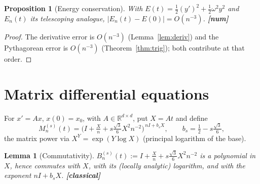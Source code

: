 \documentclass[11pt]{article}
\theoremstyle{plain}
\newtheorem{proposition}[theorem]{Proposition}
\newtheorem{lemma}[theorem]{Lemma}
\theoremstyle{definition}
\theoremstyle{remark}
\newcommand{\R}{\mathbb{R}}
\begin{document}
\begin{proposition}[Energy conservation]\label{prop:energy}
With $E(t)=\tfrac12(y')^2+\tfrac12\omega^2y^2$ and $E_n(t)$ its telescoping
analogue, $|E_n(t)-E(0)| = O(n^{-3})$. \hfill\textbf{[num]}
\end{proposition}
\begin{proof}
The derivative error is $O(n^{-3})$ (Lemma~\ref{lem:deriv}) and the Pythagorean
error is $O(n^{-3})$ (Theorem~\ref{thm:trig}); both contribute at that order.
\end{proof}

\section{Matrix differential equations}

For $x'=Ax$, $x(0)=x_0$, with $A\in\R^{d\times d}$, put $X=At$ and define
\[
  M_n^{(s)}(t) = \bigl(I + \tfrac{X}{n} + s\tfrac{\sqrt3}{6}X^2n^{-2}\bigr)^{\,nI + b_s X},
  \qquad b_s = \tfrac12 - s\tfrac{\sqrt3}{6},
\]
the matrix power via $X^Y=\exp(Y\log X)$ (principal logarithm of the base).

\begin{lemma}[Commutativity]\label{lem:comm}
$B_n^{(s)}(t) := I + \tfrac{X}{n} + s\tfrac{\sqrt3}{6}X^2n^{-2}$ is a polynomial
in $X$, hence commutes with $X$, with its (locally analytic) logarithm, and with
the exponent $nI + b_sX$. \hfill\textbf{[classical]}
\end{lemma}
\end{document}
